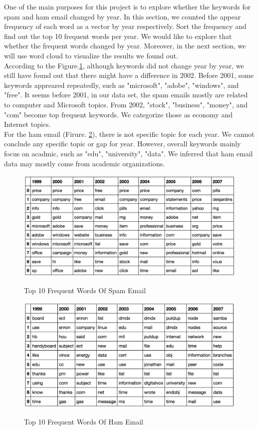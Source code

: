 One of the main purposes for this project is to explore whether the keywords for spam and ham email changed by year. In this section, we counted the appear frequency of each word as a vector by year respectively. Sort the frequency and find out the top 10 frequent words per year. We would like to explore that whether the frequent words changed by year. Moreover, in the next section, we will use word cloud to visualize the results we found out.\\

According to the Figure.\ref{fig:topwordspam}, although keywords did not change year by year, we still have found out that there might have a difference in 2002. Before 2001, some keywords appreared repeatedly, such as "microsoft", "adobe", "windows", and "free". It seems before 2001, in our data set, the spam emails mostly are related to computer and Microsoft topics. From 2002, "stock", "business", "money", and  "com" become top frequent keywords. We categorize those as economy and Internet topics. \\

For the ham email (Firure. \ref{fig:topwordham}), there is not specific topic for each year. We cannot conclude any specific topic or gap for year. However, overall keywords mainly focus on acadmic, such as "edu", "university", "data". We inferred that ham email data may mostly come from academic organizations.

\begin{figure}[ht!]
    \centering
    \includegraphics[width=13cm]{top_word_spam.png}\\
    \caption{Top 10 Frequent Words Of Spam Email}
    \label{fig:topwordspam}
\end{figure}


\begin{figure}[ht!]
    \centering
    \includegraphics[width=13cm]{top_word_ham.png}\\
    \caption{Top 10 Frequent Words Of Ham Email}
    \label{fig:topwordham}
\end{figure}


